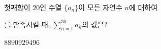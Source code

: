 \hspace*{2mm}\begin{minipage}[t]{\dimexpr\linewidth-2mm\relax}\vspace{0pt}
첫째항이 $20$인 수열 $\{a_n\}$이 모든 자연수 $n$에 대하여 \par\smallskip{}\par\smallskip\noindent 를 만족시킬 때, $\displaystyle\sum_{n=1}^{30} a_n$의 값은?
\begin{choices32}{$88$}{$90$}{$92$}{$94$}{$96$}\end{choices32}\end{minipage}
